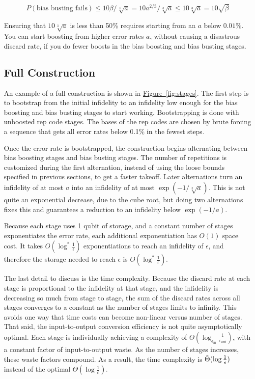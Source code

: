 \documentclass[onecolumn,unpublished,a4paper]{quantumarticle}
\theoremstyle{definition}
\theoremstyle{definition}
\theoremstyle{definition}
\newcommand{\fig}[1]{\hyperref[fig:#1]{Figure~\ref*{fig:#1}}}
\begin{document}
\begin{equation}
P(\text{bias busting fails}) \leq 10\beta / \sqrt[3]{a} = 10a^{2/3} / \sqrt[3]{a} \leq 10 \sqrt[3]{a} = 10 \sqrt{\beta}
\end{equation}

Ensuring that $10\sqrt[3]{a}$ is less than 50\% requires starting from an $a$ below $0.01\%$.
You can start boosting from higher error rates $a$, without causing a disastrous discard rate, if you do fewer boosts in the bias boosting and bias busting stages.

\subsection{Full Construction}

An example of a full construction is shown in \fig{stages}.
The first step is to bootstrap from the initial infidelity to an infidelity low enough for the bias boosting and bias busting stages to start working.
Bootstrapping is done with unboosted rep code stages.
The bases of the rep codes are chosen by brute forcing a sequence that gets all error rates below 0.1\% in the fewest steps.

Once the error rate is bootstrapped, the construction begins alternating between bias boosting stages and bias busting stages.
The number of repetitions is customized during the first alternation, instead of using the loose bounds specified in previous sections, to get a faster takeoff.
Later alternations turn an infidelity of at most $a$ into an infidelity of at most $\exp(-1/\sqrt[3]{a})$.
This is not quite an exponential decrease, due to the cube root, but doing two alternations fixes this and guarantees a reduction to an infidelity below $\exp(-1/a)$.

Because each stage uses 1 qubit of storage, and a constant number of stages exponentiates the error rate, each additional exponentiation has $O(1)$ space cost.
It takes $O(\log^{\ast} \frac{1}{\epsilon})$ exponentiations to reach an infidelity of $\epsilon$, and therefore the storage needed to reach $\epsilon$ is $O(\log^{\ast} \frac{1}{\epsilon})$.

The last detail to discuss is the time complexity.
Because the discard rate at each stage is proportional to the infidelity at that stage, and the infidelity is decreasing so much from stage to stage, the sum of the discard rates across all stages converges to a constant as the number of stages limits to infinity.
This avoids one way that time costs can become non-linear versus number of stages.
That said, the input-to-output conversion efficiency is not quite asymptotically optimal.
Each stage is individually achieving a complexity of $\Theta(\log_{\epsilon_{\text{in}}} \frac{1}{\epsilon_\text{out}})$, with a constant factor of input-to-output waste.
As the number of stages increases, these waste factors compound.
As a result, the time complexity is $\Tilde{\Theta}(\log \frac{1}{\epsilon})$ instead of the optimal $\Theta(\log \frac{1}{\epsilon})$.
\end{document}
